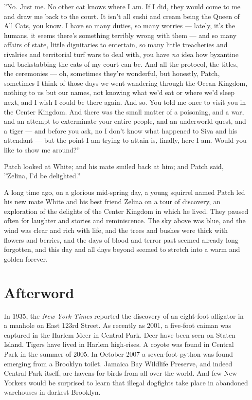 \documentclass[12pt]{book}
\begin{document}
''No. Just me. No other cat knows where I am. If I did, they would come to me and draw me back to the court. It isn't all sushi and cream being the Queen of All Cats, you know. I have so many duties, so many worries ---
lately, it's the humans, it seems there's something terribly wrong with them ---
and so many affairs of state, little dignitaries to entertain, so many little treacheries and rivalries and territorial turf wars to deal with, you have {\it no} idea how byzantine and backstabbing the cats of my court can be. And all the protocol, the titles, the ceremonies ---
oh, sometimes they're wonderful, but honestly, Patch, sometimes I think of those days we went wandering through the Ocean Kingdom, nothing to us but our names, not knowing what we'd eat or where we'd sleep next, and I wish I could be there again. And so. You told me once to visit you in the Center Kingdom. And there was the small matter of a poisoning, and a war, and an attempt to exterminate your entire people, and an underworld quest, and a tiger ---
and before you ask, no I don't know what happened to Siva and his attendant ---
but the point I am trying to attain is, finally, here I am. Would you like to show me around?''

Patch looked at White; and his mate smiled back at him; and Patch said, ''Zelina, I'd be delighted.''

A long time ago, on a glorious mid-spring day, a young squirrel named Patch led his new mate White and his best friend Zelina on a tour of discovery, an exploration of the delights of the Center Kingdom in which he lived. They paused often for laughter and stories and reminiscence. The sky above was blue, and the wind was clear and rich with life, and the trees and bushes were thick with flowers and berries, and the days of blood and terror past seemed already long forgotten, and this day and all days beyond seemed to stretch into a warm and golden forever. 


\section{Afterword}

In 1935, the {\it New York Times} reported the discovery of an eight-foot alligator in a manhole on East 123rd Street. As recently as 2001, a five-foot caiman was captured in the Harlem Meer in Central Park. Deer have been seen on Staten Island. Tigers have lived in Harlem high-rises. A coyote was found in Central Park in the summer of 2005. In October 2007 a seven-foot python was found emerging from a Brooklyn toilet. Jamaica Bay Wildlife Preserve, and indeed Central Park itself, are havens for birds from all over the world. And few New Yorkers would be surprised to learn that illegal dogfights take place in abandoned warehouses in darkest Brooklyn.
\end{document}
